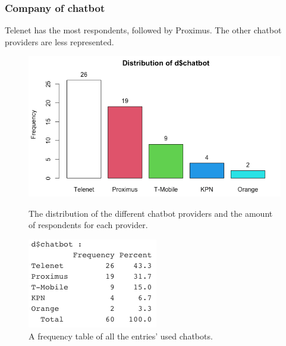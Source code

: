 \subsubsection{Company of chatbot}
Telenet has the most respondents, followed by Proximus. The other chatbot providers are less represented.
\begin{figure}[!htb]
	\includegraphics[width=\linewidth]{../LaTeX/Figures/Environments/ChatbotPlot.png}
	\caption{The distribution of the different chatbot providers and the amount of respondents for each provider.}\label{fig:chatbotPlot}
	\endminipage\hfill
	\includegraphics[width=\linewidth]{../LaTeX/Figures/Environments/ChatbotFreq.png}
	\caption{A frequency table of all the entries' used chatbots.}\label{fig:chatbotFreq}
	\endminipage\hfill
\end{figure}

